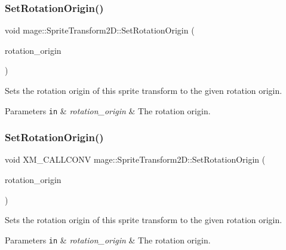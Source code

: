 \subsubsection{\texorpdfstring{Set\+Rotation\+Origin()}{SetRotationOrigin()}\hspace{0.1cm}{\footnotesize\ttfamily [2/3]}}
{\footnotesize\ttfamily void mage\+::\+Sprite\+Transform2\+D\+::\+Set\+Rotation\+Origin (\begin{DoxyParamCaption}\item[{\mbox{\hyperlink{namespacemage_aee4759dedc8def6c6dec26b5c7eddf29}{F32x2}}}]{rotation\+\_\+origin }\end{DoxyParamCaption})\hspace{0.3cm}{\ttfamily [noexcept]}}

Sets the rotation origin of this sprite transform to the given rotation origin.


\begin{DoxyParams}[1]{Parameters}
\mbox{\tt in}  & {\em rotation\+\_\+origin} & The rotation origin. \\
\hline
\end{DoxyParams}
\mbox{\label{classmage_1_1_sprite_transform2_d_a14593208cd356be5faaf95c907bb2382}} 
\subsubsection{\texorpdfstring{Set\+Rotation\+Origin()}{SetRotationOrigin()}\hspace{0.1cm}{\footnotesize\ttfamily [3/3]}}
{\footnotesize\ttfamily void X\+M\+\_\+\+C\+A\+L\+L\+C\+O\+NV mage\+::\+Sprite\+Transform2\+D\+::\+Set\+Rotation\+Origin (\begin{DoxyParamCaption}\item[{F\+X\+M\+V\+E\+C\+T\+OR}]{rotation\+\_\+origin }\end{DoxyParamCaption})\hspace{0.3cm}{\ttfamily [noexcept]}}

Sets the rotation origin of this sprite transform to the given rotation origin.


\begin{DoxyParams}[1]{Parameters}
\mbox{\tt in}  & {\em rotation\+\_\+origin} & The rotation origin. \\
\hline
\end{DoxyParams}
\mbox{\label{classmage_1_1_sprite_transform2_d_a8931ab8ceec432689f1294dcd008cbf2}} 
